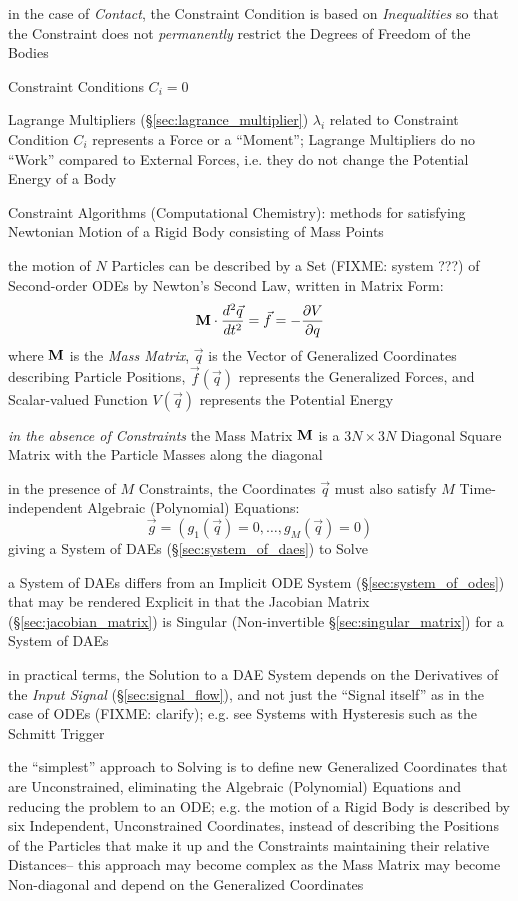 in the case of \emph{Contact}, the Constraint Condition is based on
\emph{Inequalities} so that the Constraint does not \emph{permanently} restrict
the Degrees of Freedom of the Bodies

Constraint Conditions $C_i = 0$

Lagrange Multipliers (\S\ref{sec:lagrance_multiplier}) $\lambda_i$ related to
Constraint Condition $C_i$ represents a Force or a ``Moment''; Lagrange
Multipliers do no ``Work'' compared to External Forces, i.e. they do not change
the Potential Energy of a Body

Constraint Algorithms (Computational Chemistry): methods for satisfying
Newtonian Motion of a Rigid Body consisting of Mass Points

the motion of $N$ Particles can be described by a Set (FIXME: system ???) of
Second-order ODEs by Newton's Second Law, written in Matrix Form:
\[
  \mathbf{M} \cdot \frac{d^2\vec{q}}{dt^2}
    = \vec{f} = -\frac{\partial{V}}{\partial{q}}
\]
where $\mathbf{M}$ is the \emph{Mass Matrix}, $\vec{q}$ is the Vector of
Generalized Coordinates describing Particle Positions, $\vec{f}(\vec{q})$
represents the Generalized Forces, and Scalar-valued Function $V(\vec{q})$
represents the Potential Energy

\emph{in the absence of Constraints} the Mass Matrix $\mathbf{M}$ is a $3N \times
3N$ Diagonal Square Matrix with the Particle Masses along the diagonal

in the presence of $M$ Constraints, the Coordinates $\vec{q}$ must also satisfy
$M$ Time-independent Algebraic (Polynomial) Equations:
\[
  \vec{g} = (g_1(\vec{q}) = 0, \ldots, g_M(\vec{q}) = 0)
\]
giving a System of DAEs (\S\ref{sec:system_of_daes}) to Solve

\fist a System of DAEs differs from an Implicit ODE System
(\S\ref{sec:system_of_odes}) that may be rendered Explicit in that the Jacobian
Matrix (\S\ref{sec:jacobian_matrix}) is Singular (Non-invertible
\S\ref{sec:singular_matrix}) for a System of DAEs

in practical terms, the Solution to a DAE System depends on the Derivatives of
the \emph{Input Signal} (\S\ref{sec:signal_flow}), and not just the ``Signal
itself'' as in the case of ODEs (FIXME: clarify); e.g. see Systems with
Hysteresis such as the Schmitt Trigger

the ``simplest'' approach to Solving is to define new Generalized Coordinates
that are Unconstrained, eliminating the Algebraic (Polynomial) Equations and
reducing the problem to an ODE; e.g. the motion of a Rigid Body is described by
six Independent, Unconstrained Coordinates, instead of describing the Positions
of the Particles that make it up and the Constraints maintaining their relative
Distances-- this approach may become complex as the Mass Matrix may become
Non-diagonal and depend on the Generalized Coordinates

